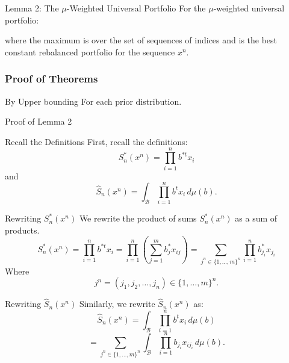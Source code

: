 \documentclass{beamer}
\begin{document}
\begin{small}
\begin{frame}{Lemma 2: The $\mu$-Weighted Universal Portfolio}
    For the $\mu$-weighted universal portfolio:
    \R{\[
        \frac{S_n^*(x^n)}{\hat{S}_n(x^n)} 
        \leq \max\limits_{j^n} \frac{\prod\limits_{i=1}^{n} b^*_{j_i}}{\int_{\mathcal{B}} \prod\limits_{i=1}^{n} b_{j_i} \, d\mu(b)}
    \]}
    
    where the maximum is over the set of sequences of indices 
    \R{\[
        j^n \in \{1, \dots, m\}^n,
    \]}
    and 
    \R{\[
        \mathbf{b}^* = (b^*_1, \dots, b^*_m)^t
    \]}
    is the best constant rebalanced portfolio for the sequence \( x^n \).
\end{frame}

\begin{frame}
  \frametitle{Proof of Theorems}

  By Upper bounding
  \R{\[
      \max\limits_{j^n} \frac{\prod\limits_{i=1}^{n} b^*_{j_i}}{\int_{\mathcal{B}} \prod\limits_{i=1}^{n} b_{j_i} \, d\mu(b)}
    \]}
  For each prior distribution. 
\end{frame}


\begin{frame}
    \centering
    \Huge Proof of Lemma 2
\end{frame}

\begin{frame}{Recall the Definitions}
    First, recall the definitions:
    \[
        S_n^*(x^n) = \prod_{i=1}^{n} b^{*t} x_i
    \]
    and
    \[
        \hat{S}_n(x^n) = \int_{\mathcal{B}} \prod_{i=1}^{n} b^t x_i \, d\mu(b).
    \]
\end{frame}

\begin{frame}{Rewriting \( S_n^*(x^n) \)}
    We rewrite the product of sums \( S_n^*(x^n) \) as a sum of products.
    \[
        S_n^*(x^n) = \prod_{i=1}^{n} b^{*t} x_i
        = \prod_{i=1}^{n} \left( \sum_{j=1}^{m} b_j^* x_{ij} \right)
        = \sum_{j^n \in \{1, \dots, m\}^n} \prod_{i=1}^{n} b^*_{j_i} x_{j_i}
    \]
    Where
    \[
        j^n = (j_1, j_2, \dots, j_n) \in \{1, \dots, m\}^n.
    \]
\end{frame}

\begin{frame}{Rewriting \( \hat{S}_n(x^n) \)}
    Similarly, we rewrite \( \hat{S}_n(x^n) \) as:
    \[
        \hat{S}_n(x^n) = \int_{\mathcal{B}} \prod_{i=1}^{n} b^t x_i \, d\mu(b)
    \]
    \[
        = \sum_{j^n \in \{1, \dots, m\}^n} \int_{\mathcal{B}} \prod_{i=1}^{n} b_{j_i} x_{ij_i} \, d\mu(b).
    \]
\end{frame}


\end{small}
\end{document}
